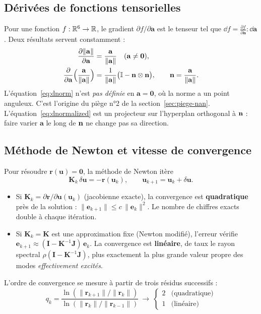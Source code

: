 \subsection{Dérivées de fonctions tensorielles}

Pour une fonction $f:\mathbb{R}^6\to\mathbb{R}$, le gradient $\partial f/\partial\mathbf{a}$ est le tenseur tel que $\dd f = \frac{\partial f}{\partial\mathbf{a}}:\dd\mathbf{a}$. Deux résultats servent constamment :
\begin{align}
\frac{\partial\|\mathbf{a}\|}{\partial\mathbf{a}} &= \frac{\mathbf{a}}{\|\mathbf{a}\|}\quad(\mathbf{a}\neq\mathbf{0}),\label{eq:dnorm}\\
\frac{\partial}{\partial\mathbf{a}}\Big(\frac{\mathbf{a}}{\|\mathbf{a}\|}\Big) &= \frac{1}{\|\mathbf{a}\|}\big(\mathbb{I}-\mathbf{n}\otimes\mathbf{n}\big),\qquad \mathbf{n}=\frac{\mathbf{a}}{\|\mathbf{a}\|}.\label{eq:dnormalized}
\end{align}
L'équation~\eqref{eq:dnorm} n'est \emph{pas définie} en $\mathbf{a}=\mathbf{0}$, où la norme a un point anguleux. C'est l'origine du piège n°2 de la section~\ref{sec:piege-nan}. L'équation~\eqref{eq:dnormalized} est un projecteur sur l'hyperplan orthogonal à $\mathbf{n}$ : faire varier $\mathbf{a}$ le long de $\mathbf{n}$ ne change pas sa direction.

\subsection{Méthode de Newton et vitesse de convergence}\label{sec:newton}

Pour résoudre $\mathbf{r}(\mathbf{u})=\mathbf{0}$, la méthode de Newton itère
\begin{equation}
\mathbf{K}_k\,\delta\mathbf{u} = -\mathbf{r}(\mathbf{u}_k),\qquad \mathbf{u}_{k+1}=\mathbf{u}_k+\delta\mathbf{u}.
\end{equation}
\begin{itemize}[nosep]
  \item Si $\mathbf{K}_k = \partial\mathbf{r}/\partial\mathbf{u}(\mathbf{u}_k)$ (jacobienne exacte), la convergence est \textbf{quadratique} près de la solution : $\|\mathbf{e}_{k+1}\|\le c\,\|\mathbf{e}_k\|^2$. Le nombre de chiffres exacts double à chaque itération.
  \item Si $\mathbf{K}_k=\mathbf{K}$ est une approximation fixe (Newton modifié), l'erreur vérifie $\mathbf{e}_{k+1}\approx(\mathbf{I}-\mathbf{K}^{-1}\mathbf{J})\,\mathbf{e}_k$. La convergence est \textbf{linéaire}, de taux le rayon spectral $\rho(\mathbf{I}-\mathbf{K}^{-1}\mathbf{J})$, plus exactement la plus grande valeur propre des modes \emph{effectivement excités}.
\end{itemize}
L'ordre de convergence se mesure à partir de trois résidus successifs :
\begin{equation}
q_k = \frac{\ln(\|\mathbf{r}_{k+1}\|/\|\mathbf{r}_k\|)}{\ln(\|\mathbf{r}_k\|/\|\mathbf{r}_{k-1}\|)}\ \longrightarrow\ \begin{cases}2&\text{(quadratique)}\\1&\text{(linéaire)}\end{cases}
\label{eq:ordre}
\end{equation}

